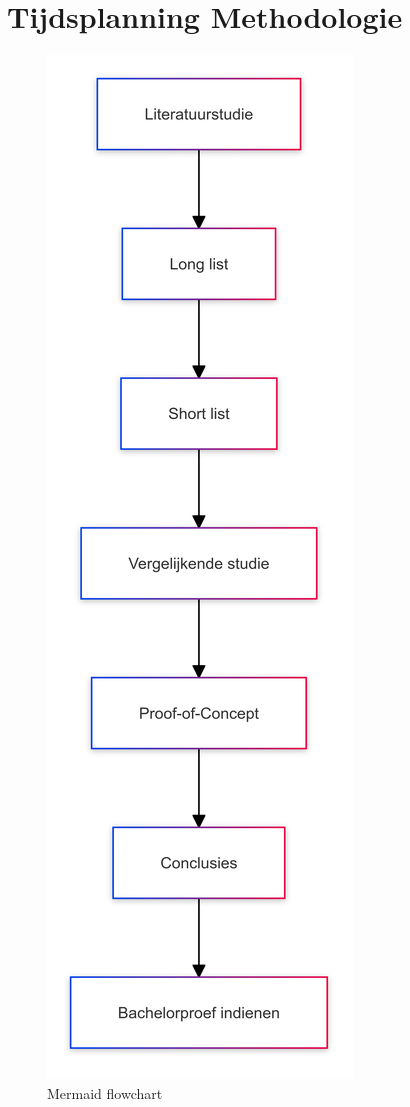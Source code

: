 \section{Tijdsplanning Methodologie}%
\label{sec:tijdsplanning}
\begin{figure}[h]
  \centering
  \includegraphics[scale=0.1]{MermaidChart.png}
  \caption{Mermaid flowchart}
  \label{fig:mermaid-chart}
\end{figure}

